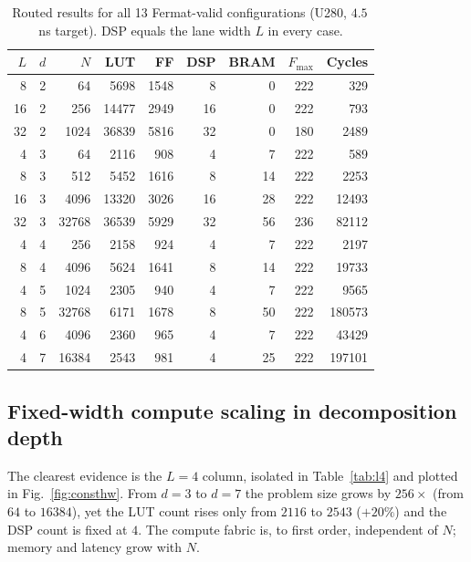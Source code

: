 \documentclass[conference]{IEEEtran}
\begin{document}
\begin{table}[t]
\centering
\caption{Routed results for all 13 Fermat-valid configurations (U280, $4.5$\,ns
target). DSP equals the lane width $L$ in every case.}
\label{tab:grid}
\footnotesize
\setlength{\tabcolsep}{6pt}
\begin{tabular}{rrrrrrrrr}
\toprule
$L$ & $d$ & $N$ & LUT & FF & DSP & BRAM & $F_{\max}$ & Cycles\\
\midrule
8  & 2 & \num{64}    & \num{5698}  & \num{1548} & 8  & 0  & 222 & \num{329}\\
16 & 2 & \num{256}   & \num{14477} & \num{2949} & 16 & 0  & 222 & \num{793}\\
32 & 2 & \num{1024}  & \num{36839} & \num{5816} & 32 & 0  & 180 & \num{2489}\\
4  & 3 & \num{64}    & \num{2116}  & \num{908}  & 4  & 7  & 222 & \num{589}\\
8  & 3 & \num{512}   & \num{5452}  & \num{1616} & 8  & 14 & 222 & \num{2253}\\
16 & 3 & \num{4096}  & \num{13320} & \num{3026} & 16 & 28 & 222 & \num{12493}\\
32 & 3 & \num{32768} & \num{36539} & \num{5929} & 32 & 56 & 236 & \num{82112}\\
4  & 4 & \num{256}   & \num{2158}  & \num{924}  & 4  & 7  & 222 & \num{2197}\\
8  & 4 & \num{4096}  & \num{5624}  & \num{1641} & 8  & 14 & 222 & \num{19733}\\
4  & 5 & \num{1024}  & \num{2305}  & \num{940}  & 4  & 7  & 222 & \num{9565}\\
8  & 5 & \num{32768} & \num{6171}  & \num{1678} & 8  & 50 & 222 & \num{180573}\\
4  & 6 & \num{4096}  & \num{2360}  & \num{965}  & 4  & 7  & 222 & \num{43429}\\
4  & 7 & \num{16384} & \num{2543}  & \num{981}  & 4  & 25 & 222 & \num{197101}\\
\bottomrule
\end{tabular}
\end{table}

\subsection{Fixed-width compute scaling in decomposition depth}
The clearest evidence is the $L=4$ column, isolated in Table~\ref{tab:l4} and
plotted in Fig.~\ref{fig:consthw}. From $d=3$ to $d=7$ the problem size grows by
$256\times$ (from $64$ to $16384$), yet the LUT count rises only from $2116$ to
$2543$ ($+20\%$) and the DSP count is fixed at $4$. The compute fabric is, to
first order, independent of $N$; memory and latency grow with $N$.
\end{document}
